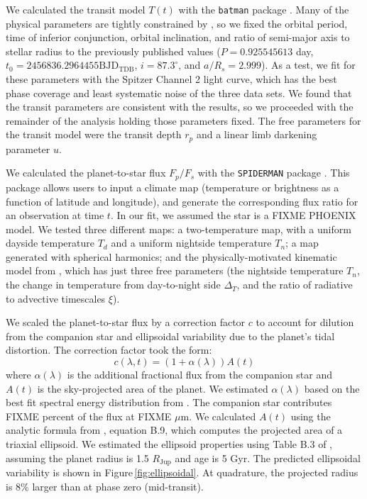 \documentclass[twocolumn]{aastex61}
\begin{document}
We calculated the transit model $T(t)$ with the \texttt{batman} package \citep{kreidberg15a}. Many of the physical parameters are tightly constrained by \cite{southworth15}, so we fixed the orbital period, time of inferior conjunction, orbital inclination, and ratio of semi-major axis to stellar radius to the previously published values ($P = 0.925545613$ day, $t_0 = 2456836.2964455 \mathrm{BJD_{TDB}}$, $i = 87.3^\circ$, and $a/R_s = 2.999$). As a test, we fit for these parameters with the Spitzer Channel 2 light curve, which has the best phase coverage and least systematic noise of the three data sets. We found that the transit parameters are consistent with the \cite{southworth15} results, so we proceeded with the remainder of the analysis holding those parameters fixed.  The free parameters for the transit model were the transit depth $r_p$ and a linear limb darkening parameter $u$. 

We calculated the planet-to-star flux $F_p/F_s$ with the \texttt{SPIDERMAN} package \citep{louden17}.  This package allows users to input a climate map (temperature or brightness as a function of latitude and longitude), and generate the corresponding flux ratio for an observation at time $t$. In our fit, we assumed the star is a FIXME PHOENIX model.  We tested three different maps: a two-temperature map, with a uniform dayside temperature $T_d$ and a uniform nightside temperature $T_n$; a map generated with spherical harmonics; and the physically-motivated kinematic model from \cite{zhang16}, which has just three free parameters (the nightside temperature $T_n$, the change in temperature from day-to-night side $\Delta_T$, and the ratio of radiative to advective timescales $\xi$). 

We scaled the planet-to-star flux by a correction factor $c$ to account for dilution from the companion star and ellipsoidal variability due to the planet's tidal distortion. The correction factor took the form: 
\begin{equation}
	c(\lambda, t) = (1 + \alpha(\lambda))A(t)
\end{equation}
where $\alpha(\lambda)$ is the additional fractional flux from the companion star and $A(t)$ is the sky-projected area of the planet. We estimated $\alpha(\lambda)$ based on the best fit spectral energy distribution from \cite{cartier16}. The companion star contributes FIXME percent of the flux at FIXME $\mu$m.  We calculated $A(t)$ using the analytic formula from \cite{leconte11b}, equation B.9, which computes the projected area of a triaxial ellipsoid. We estimated the ellipsoid properties using Table B.3 of \cite{leconte11a}, assuming the planet radius is 1.5 $R_\mathrm{Jup}$ and age is 5 Gyr. The predicted ellipsoidal variability is shown in Figure\,\ref{fig:ellipsoidal}. At quadrature, the projected radius is $8\%$ larger than at phase zero (mid-transit). %
\end{document}
